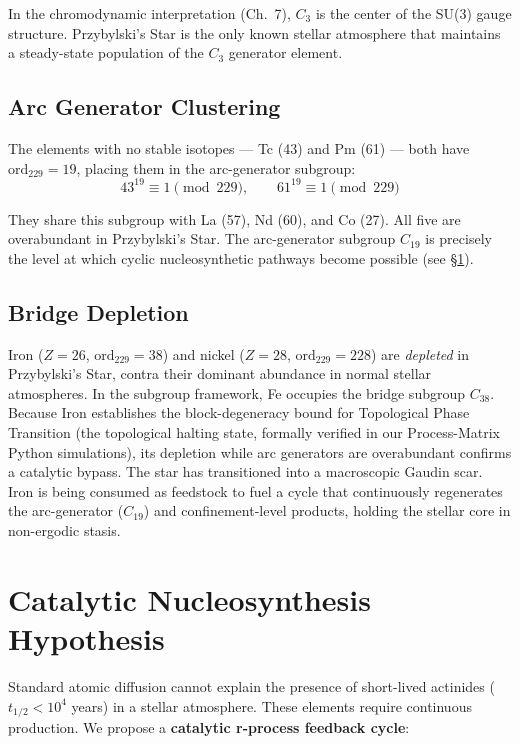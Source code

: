 In the chromodynamic interpretation (Ch.~7), $C_3$ is the center of the
SU(3) gauge structure. Przybylski's Star is the only known stellar
atmosphere that maintains a steady-state population of the $C_3$ generator element.

\subsection{Arc Generator Clustering}

The elements with no stable isotopes --- Tc (43) and Pm (61) --- both have
$\text{ord}_{229} = 19$, placing them in the arc-generator subgroup:
\begin{equation}
43^{19} \equiv 1 \pmod{229}, \qquad 61^{19} \equiv 1 \pmod{229}
\end{equation}

They share this subgroup with La (57), Nd (60), and Co (27). All five are
overabundant in Przybylski's Star. The arc-generator subgroup $C_{19}$
is precisely the level at which cyclic nucleosynthetic pathways become possible
(see \S\ref{sec:catalytic}).

\subsection{Bridge Depletion}

Iron ($Z = 26$, $\text{ord}_{229} = 38$) and nickel ($Z = 28$, $\text{ord}_{229} = 228$)
are \emph{depleted} in Przybylski's Star, contra their dominant abundance in
normal stellar atmospheres. In the subgroup framework, Fe occupies the bridge
subgroup $C_{38}$. Because Iron establishes the block-degeneracy bound for 
Topological Phase Transition (the topological halting state, formally verified in 
our Process-Matrix Python simulations), its depletion while arc generators 
are overabundant confirms a catalytic bypass. The star has transitioned into 
a macroscopic Gaudin scar. Iron is being consumed as feedstock to fuel a 
cycle that continuously regenerates the arc-generator ($C_{19}$) and 
confinement-level products, holding the stellar core in non-ergodic stasis.


\section{Catalytic Nucleosynthesis Hypothesis}
\label{sec:catalytic}

Standard atomic diffusion cannot explain the presence of short-lived actinides
($t_{1/2} < 10^4$ years) in a stellar atmosphere. These elements require
continuous production. We propose a \textbf{catalytic r-process feedback cycle}:

